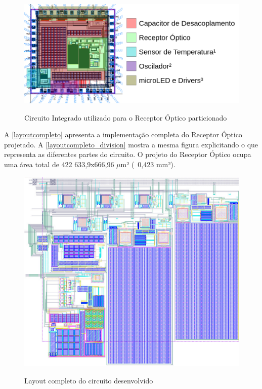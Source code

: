 \begin{figure}[htb]
 \centering
    \caption{Circuito Integrado utilizado para o Receptor Óptico particionado} 
    \includegraphics[scale=0.4]{Resultados/Imagens/Image_CircuitoIntegrado.png}
    \label{fig_circintegrado_division}
\end{figure}

A \autoref{layoutcompleto} apresenta a implementação completa do Receptor Óptico projetado. A \autoref{layoutcompleto_division} mostra a mesma figura explicitando o que representa as diferentes partes do circuito. O projeto do Receptor Óptico ocupa uma área total de 422 633,9x666,96 $\mu$m² (~0,423 mm²).

\begin{figure}[htb]
 \centering
    \caption{Layout completo do circuito desenvolvido} 
    \includegraphics[scale=1, angle = 90]{Resultados/Imagens/Circuito Completo.png}
    \label{layoutcompleto}
\end{figure}

